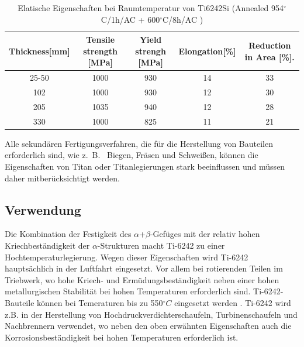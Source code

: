 \begin{table}[H]
		\small
		\tabcolsep=0.09cm
		\centering	
		\begin{tabular}{|c |c |c|c |c|}
			\hline
			Thickness[mm] & Tensile strength [MPa] & Yield strengh [MPa] & Elongation[\%]& Reduction in Area [\%]. \\
			\hline
			25-50&1000&930&14&33\\
			102&1000&930&12&30\\
			205&1035&940&12&28\\
			330&1000&825&11&21\\
			
			\hline
	    \end{tabular}
		\caption{Elatische Eigenschaften bei Raumtemperatur von Ti6242Si (Annealed 954$^\circ$C/1h/AC + 600$^\circ$C/8h/AC ) \cite{M.J.Donachie.2010}}
		\label{Mecprop}
\end{table}
	
	
	Alle sekundären Fertigungsverfahren, die für die Herstellung von Bauteilen erforderlich sind, wie z.~B.~ Biegen, Fräsen und Schweißen, können die  Eigenschaften von Titan oder Titanlegierungen stark beeinflussen und müssen daher mitberücksichtigt werden.
	
	
\subsection{Verwendung}
	
	
	Die Kombination der Festigkeit des $\alpha$+$\beta$-Gefüges mit der relativ hohen Kriechbeständigkeit der $\alpha$-Strukturen macht Ti-6242 zu einer Hochtemperaturlegierung. 
	Wegen dieser Eigenschaften wird Ti-6242 hauptsächlich in der Luftfahrt eingesetzt. Vor allem bei rotierenden Teilen im Triebwerk, wo hohe Kriech- und Ermüdungsbeständigkeit neben einer hohen metallurgischen Stabilität bei hohen Temperaturen erforderlich sind. 
	Ti-6242-Bauteile können bei Temeraturen bis zu 550$^\circ C$ eingesetzt werden \cite{C.Leyens.2005}.
	Ti-6242 wird z.B. in der Herstellung von Hochdruckverdichterschaufeln, Turbinenschaufeln und Nachbrennern verwendet, wo neben den oben erwähnten Eigenschaften auch die Korrosionsbeständigkeit bei hohen Temperaturen erforderlich ist. 
	
	
	
	
	
